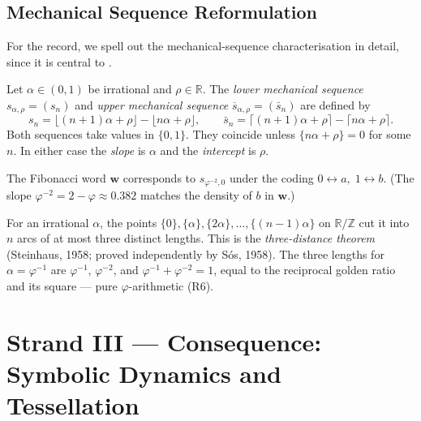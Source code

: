\subsection{Mechanical Sequence Reformulation}
\label{subsec:ch19-mechanical}

For the record, we spell out the mechanical-sequence characterisation
in detail, since it is central to \cite{lothaire2002algebraic}.

\begin{definition}\label{def:mechanical}
  Let \(\alpha\in(0,1)\) be irrational and \(\rho\in\mathbb{R}\).
  The \emph{lower mechanical sequence} \(s_{\alpha,\rho}=(s_n)\) and
  \emph{upper mechanical sequence} \(\overline{s}_{\alpha,\rho}=(\bar s_n)\)
  are defined by
  \[
    s_n = \lfloor (n+1)\alpha+\rho\rfloor - \lfloor n\alpha+\rho\rfloor,
    \qquad
    \bar s_n = \lceil(n+1)\alpha+\rho\rceil - \lceil n\alpha+\rho\rceil.
  \]
  Both sequences take values in \(\{0,1\}\).  They coincide unless
  \(\{n\alpha+\rho\}=0\) for some \(n\).  In either case the
  \emph{slope} is \(\alpha\) and the \emph{intercept} is \(\rho\).
\end{definition}

The Fibonacci word \(\mathbf{w}\) corresponds to
\(s_{\varphi^{-2},0}\) under the coding \(0\leftrightarrow a,\;1\leftrightarrow b\).
(The slope \(\varphi^{-2}=2-\varphi\approx 0.382\) matches the
density of \(b\) in \(\mathbf{w}\).)

\begin{remark}
  For an irrational \(\alpha\), the points
  \(\{0\},\{\alpha\},\{2\alpha\},\ldots,\{(n-1)\alpha\}\) on
  \(\mathbb{R}/\mathbb{Z}\) cut it into \(n\) arcs of at most
  three distinct lengths.  This is the \emph{three-distance theorem}
  (Steinhaus, 1958; proved independently by S\'os, 1958).
  The three lengths for \(\alpha=\varphi^{-1}\) are
  \(\varphi^{-1}\), \(\varphi^{-2}\), and \(\varphi^{-1}+\varphi^{-2}=1\),
  equal to the reciprocal golden ratio and its square --- pure
  \(\varphi\)-arithmetic (R6).
\end{remark}

\section{Strand III --- Consequence: Symbolic Dynamics and Tessellation}
\label{sec:ch19-strand-iii}


